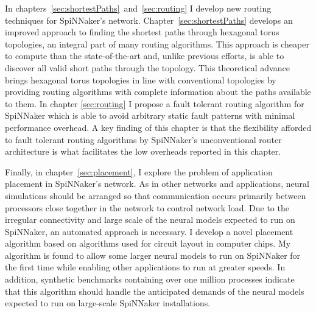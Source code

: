 In chapters~\ref{sec:shortestPaths}~and~\ref{sec:routing} I develop new routing
techniques for SpiNNaker's network. Chapter~\ref{sec:shortestPaths} develops an
improved approach to finding the shortest paths through hexagonal torus
topologies, an integral part of many routing algorithms. This approach is
cheaper to compute than the state-of-the-art and, unlike previous efforts, is
able to discover all valid short paths through the topology. This theoretical
advance brings hexagonal torus topologies in line with conventional topologies
by providing routing algorithms with complete information about the paths
available to them. In chapter \ref{sec:routing} I propose a fault tolerant
routing algorithm for SpiNNaker which is able to avoid arbitrary static fault
patterns with minimal performance overhead. A key finding of this chapter is
that the flexibility afforded to fault tolerant routing algorithms by
SpiNNaker's unconventional router architecture is what facilitates the low
overheads reported in this chapter.

Finally, in chapter~\ref{sec:placement}, I explore the problem of application
placement in SpiNNaker's network. As in other networks and applications, neural
simulations should be arranged so that communication occurs primarily between
processors close together in the network to control network load. Due to the
irregular connectivity and large scale of the neural models expected to run on
SpiNNaker, an automated approach is necessary. I develop a novel placement
algorithm based on algorithms used for circuit layout in computer chips. My
algorithm is found to allow some larger neural models to run on SpiNNaker for
the first time while enabling other applications to run at greater speeds. In
addition, synthetic benchmarks containing over one million processes indicate
that this algorithm should handle the anticipated demands of the neural models
expected to run on large-scale SpiNNaker installations.
